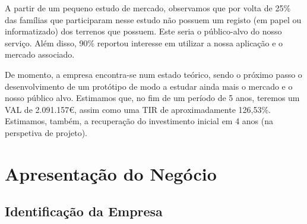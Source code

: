 \documentclass[11pt]{article}
\begin{document}
	A partir de um pequeno estudo de mercado, observamos que por volta de 25\% das famílias que participaram nesse estudo não possuem um registo (em papel ou informatizado) dos terrenos que possuem. Este seria o público-alvo do nosso serviço. Além disso, 90\% reportou interesse em utilizar a nossa aplicação e o mercado associado.
	
	De momento, a empresa encontra-se num estado teórico, sendo o próximo passo o desenvolvimento de um protótipo de modo a estudar ainda mais o mercado e o nosso público alvo. Estimamos que, no fim de um período de 5 anos, teremos um VAL de 2.091.157€, assim como uma TIR de aproximadamente 126,53\%. Estimamos, também, a recuperação do investimento inicial em 4 anos (na perspetiva de projeto).
	
	\pagebreak
	
	\large
	\section{Apresentação do Negócio}
	\subsection{Identificação da Empresa}
	
	\normalsize
	
\end{document}
